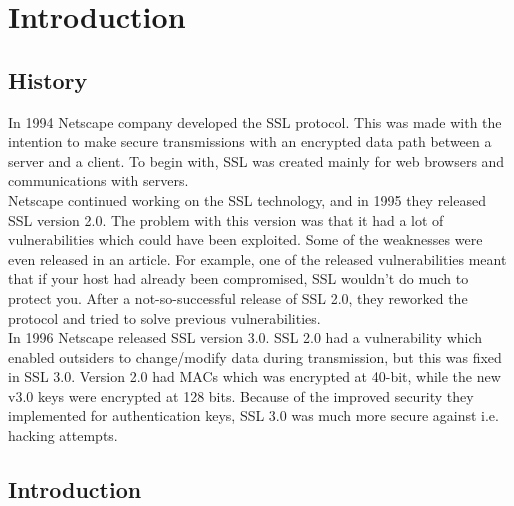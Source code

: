 \section{Introduction} %

\subsection{History} %

In 1994 Netscape company developed the SSL protocol. This was made with the intention to make secure transmissions with an encrypted data path between a server and a client. To begin with, SSL was created mainly for web browsers and communications with servers.\cite{sslHist} \\
Netscape continued working on the SSL technology, and in 1995 they released SSL version 2.0. The problem with this version was that it had a lot of vulnerabilities which could have been exploited. Some of the weaknesses were even released in an article\cite{sslv2}. For example, one of the released vulnerabilities meant that if your host had already been compromised, SSL wouldn't do much to protect you. After a not-so-successful release of SSL 2.0, they reworked the protocol and tried to solve previous vulnerabilities. \\
In 1996 Netscape released SSL version 3.0. SSL 2.0 had a vulnerability which enabled outsiders to change/modify data during transmission, but this was fixed in SSL 3.0. Version 2.0 had MACs which was encrypted at 40-bit, while the new v3.0 keys were encrypted at 128 bits. Because of the improved security they implemented for authentication keys, SSL 3.0 was much more secure against i.e. hacking attempts. \cite{eHowSSL,sslHist}

\subsection{Introduction} %

